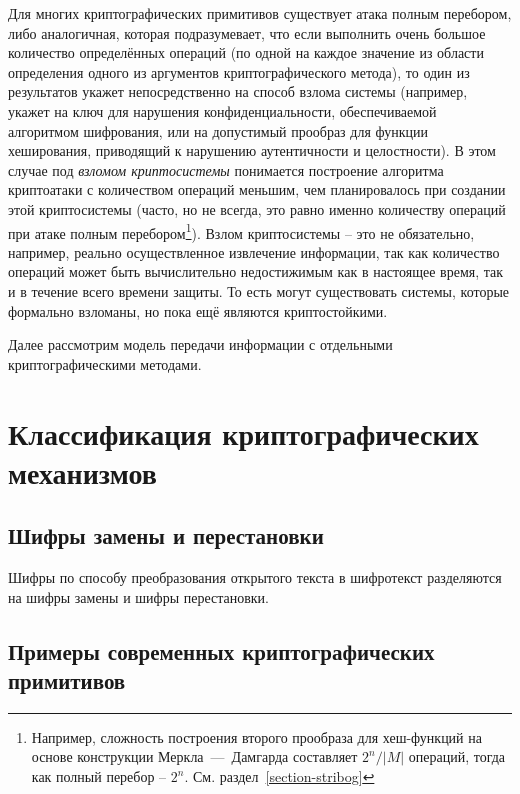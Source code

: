 Для многих криптографических примитивов существует атака полным перебором, либо аналогичная, которая подразумевает, что если выполнить очень большое количество определённых операций (по одной на каждое значение из области определения одного из аргументов криптографического метода), то один из результатов укажет непосредственно на способ взлома системы (например, укажет на ключ для нарушения конфиденциальности, обеспечиваемой алгоритмом шифрования, или на допустимый прообраз для функции хеширования, приводящий к нарушению аутентичности и целостности). В этом случае под \emph{взломом криптосистемы} понимается построение алгоритма криптоатаки с количеством операций меньшим, чем планировалось при создании этой криптосистемы (часто, но не всегда, это равно именно количеству операций при атаке полным перебором\footnote{Например, сложность построения второго прообраза для хеш-функций на основе конструкции Меркла~---~Дамгарда составляет $2^n / \left|M\right|$ операций, тогда как полный перебор -- $2^n$. См. раздел~\ref{section-stribog}}). Взлом криптосистемы – это не обязательно, например, реально осуществленное извлечение информации, так как количество операций может быть вычислительно недостижимым как в настоящее время, так и в течение всего времени защиты. То есть могут существовать системы, которые формально взломаны, но пока ещё являются криптостойкими.

Далее рассмотрим модель передачи информации с отдельными криптографическими методами.



\section[Классификация]{Классификация криптографических механизмов}


\subsection{Шифры замены и перестановки}

Шифры по способу преобразования открытого текста в шифротекст разделяются на шифры замены и шифры перестановки.







\subsection{Примеры современных криптографических примитивов}

